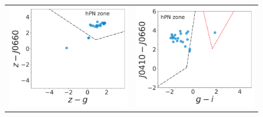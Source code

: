 \documentclass[11pt]{article}
\newcommand\raiselabel[1]{\raisebox{0.9\figwidth}[-0.5\figwidth]{#1}}
\begin{document}
\begin{figure}[1h]
\begin{tabular}{l l}
\includegraphics[width=0.5\linewidth, trim=10 10 10 10, clip]{Fig3-IDR2-SPLUS-z.pdf} & \includegraphics[width=0.5\linewidth, trim=10 10 10 10, clip]{Fig5-IDR2-SPLUS-gi.pdf} \\
  
  \end{tabular}
\end{figure}

\newpage



\end{document}

